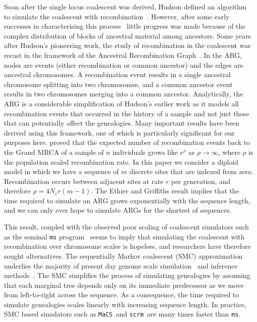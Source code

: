 \documentclass[10pt]{article}
\newcommand{\ms}[0]{\texttt{ms}}
\newcommand{\scrm}[0]{\texttt{scrm}}
\newcommand{\MaCS}[0]{\texttt{MaCS}}
\begin{document}
Soon after the single locus coalescent was derived, Hudson defined an algorithm
to simulate the coalescent with recombination~\citep{h83b}. However, after some
early successes in characterising this process~\citep{hk85,kh85} little
progress was made because of the complex distribution of blocks of ancestral
material among ancestors. Some years after Hudson's pioneering work, the study
of recombination in the coalescent was recast in the framework of the Ancestral
Recombination Graph~\citep{g91,gm97}. In the ARG, nodes are events
(either recombination or common ancestor) and the edges are ancestral
chromosomes. A recombination event results in a single ancestral chromosome
splitting into two chromosomes, and a common ancestor event results in two
chromosomes merging into a common ancestor. Analytically, the ARG is a
considerable simplification of Hudson's earlier work as it models all
recombination events that occurred in the history of a sample and not just
those that can potentially affect the genealogies. Many important results have
been derived using this framework, one of which is particularly significant for
our purposes here. \citet{eg90} proved that the expected number of recombination
events back to the Grand MRCA of a sample of $n$ individuals grows like $e^\rho$
as $\rho \rightarrow \infty$, where $\rho$ is the population scaled
recombination rate. In this paper we consider a diploid model in which we have
a sequence of $m$ discrete sites that are indexed from zero. Recombination
occurs between adjacent sites at rate $r$ per generation, and therefore
$\rho = 4 N_e r(m - 1)$. The Ethier and Griffiths result implies that
the time required to simulate
an ARG grows exponentially with the sequence length, and we can only
ever hope to simulate ARGs for the shortest of sequences.

This result, coupled with the observed poor scaling of coalescent simulators
such as the seminal \texttt{ms} program~\citep{h02} seems to imply that
simulating the coalescent with recombination over chromosome scales is
hopeless, and researchers have therefore sought alternatives. The sequentially
Markov coalescent (SMC) approximation~\citep{mc05,mw06} underlies the majority
of present day genome scale simulation~\citep{cmw09,ef11,szml14} and inference
methods~\citep{ld11,sd14,rhgs14}. The SMC simplifies the process of simulating
genealogies by assuming that each marginal tree depends only on its immediate
predecessor as we move from left-to-right across the sequence. As a
consequence, the time required to simulate genealogies scales linearly with
increasing sequence length. In practice, SMC based simulators such as \MaCS\
and \scrm\ are many times faster than \ms.
\end{document}
